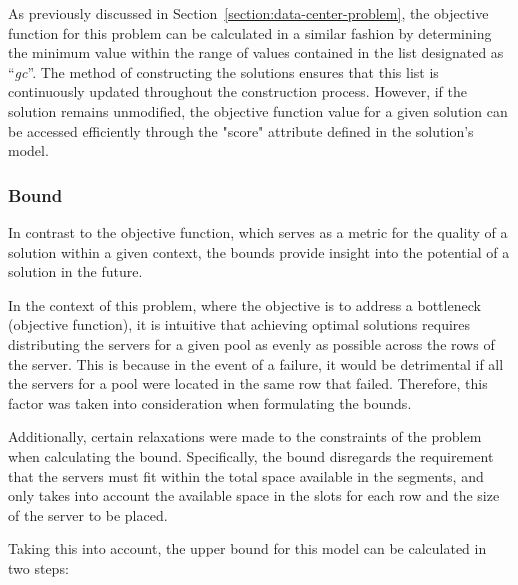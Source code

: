 As previously discussed in Section~\ref{section:data-center-problem}, the
objective function for this problem can be calculated in a similar fashion by
determining the minimum value within the range of values contained in the list
designated as ``\textit{gc}''. The method of constructing the solutions ensures that
this list is continuously updated throughout the construction process. However,
if the solution remains unmodified, the objective function value for a given
solution can be accessed efficiently through the "score" attribute defined in
the solution's model.

\subsubsection{Bound}
\label{section:data-center-bound}

In contrast to the objective function, which serves as a metric for the quality
of a solution within a given context, the bounds provide insight into the
potential of a solution in the future.

In the context of this problem, where the objective is to address a bottleneck
(objective function), it is intuitive that achieving optimal solutions requires
distributing the servers for a given pool as evenly as possible across the rows
of the server. This is because in the event of a failure, it would be
detrimental if all the servers for a pool were located in the same row that
failed. Therefore, this factor was taken into consideration when formulating the
bounds.

Additionally, certain relaxations were made to the constraints of the problem
when calculating the bound. Specifically, the bound disregards the requirement
that the servers must fit within the total space available in the segments, and
only takes into account the available space in the slots for each row and the
size of the server to be placed.

Taking this into account, the upper bound for this model can be calculated in
two steps:

